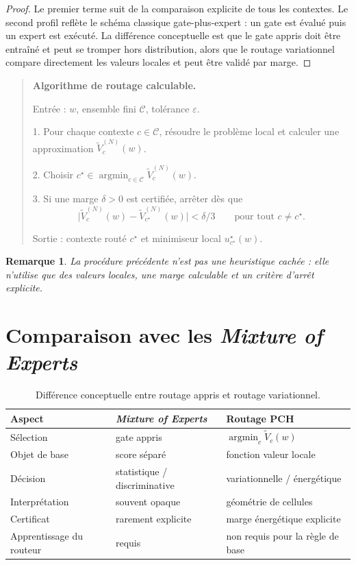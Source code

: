 \documentclass[11pt,a4paper]{article}
\newtheorem{remark}{Remarque}[section]
\DeclareMathOperator{\argmin}{argmin}
\newcommand{\Ccal}{\mathcal C}
\begin{document}
\begin{proof}
Le premier terme suit de la comparaison explicite de tous les contextes. Le second profil reflète le schéma classique gate-plus-expert : un gate est évalué puis un expert est exécuté. La différence conceptuelle est que le gate appris doit être entraîné et peut se tromper hors distribution, alors que le routage variationnel compare directement les valeurs locales et peut être validé par marge.
\end{proof}

\begin{quote}
\small
\textbf{Algorithme de routage calculable.}

Entrée : \(w\), ensemble fini \(\Ccal\), tolérance \(\varepsilon\).

1. Pour chaque contexte \(c\in\Ccal\), résoudre le problème local et calculer une approximation \(\widetilde V_c^{(N)}(w)\).

2. Choisir \(c^\star\in\argmin_{c\in\Ccal}\widetilde V_c^{(N)}(w)\).

3. Si une marge \(\delta>0\) est certifiée, arrêter dès que
\[
\bigl|\widetilde V_c^{(N)}(w)-\widetilde V_{c^\star}^{(N)}(w)\bigr|<\delta/3
\qquad\text{pour tout }c\neq c^\star.
\]

Sortie : contexte routé \(c^\star\) et minimiseur local \(u_{c^\star}^\star(w)\).
\end{quote}

\begin{remark}
La procédure précédente n'est pas une heuristique cachée : elle n'utilise que des valeurs locales, une marge calculable et un critère d'arrêt explicite.
\end{remark}

\section{Comparaison avec les \emph{Mixture of Experts}}

\begin{table}[ht]
\centering
\begin{tabular}{@{}lll@{}}
\toprule
Aspect & \emph{Mixture of Experts} & Routage PCH \\
\midrule
Sélection & gate appris & \(\argmin_c \widetilde V_c(w)\) \\
Objet de base & score séparé & fonction valeur locale \\
Décision & statistique / discriminative & variationnelle / énergétique \\
Interprétation & souvent opaque & géométrie de cellules \\
Certificat & rarement explicite & marge énergétique explicite \\
Apprentissage du routeur & requis & non requis pour la règle de base \\
\bottomrule
\end{tabular}
\caption{Différence conceptuelle entre routage appris et routage variationnel.}
\end{table}
\end{document}
